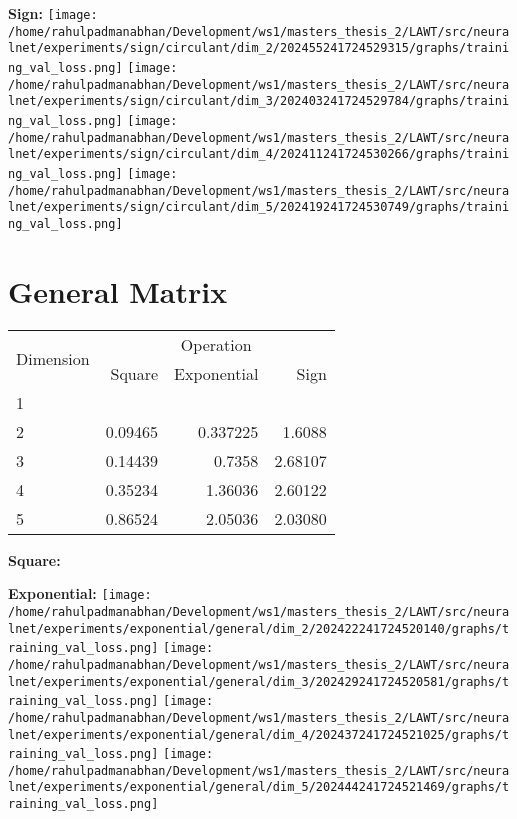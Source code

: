 \documentclass{article}
\begin{document}
\textbf{Sign:}
\texttt{[image: /home/rahulpadmanabhan/Development/ws1/masters\_thesis\_2/LAWT/src/neuralnet/experiments/sign/circulant/dim\_2/202455241724529315/graphs/training\_val\_loss.png]}
\texttt{[image: /home/rahulpadmanabhan/Development/ws1/masters\_thesis\_2/LAWT/src/neuralnet/experiments/sign/circulant/dim\_3/202403241724529784/graphs/training\_val\_loss.png]}
\texttt{[image: /home/rahulpadmanabhan/Development/ws1/masters\_thesis\_2/LAWT/src/neuralnet/experiments/sign/circulant/dim\_4/202411241724530266/graphs/training\_val\_loss.png]}
\texttt{[image: /home/rahulpadmanabhan/Development/ws1/masters\_thesis\_2/LAWT/src/neuralnet/experiments/sign/circulant/dim\_5/202419241724530749/graphs/training\_val\_loss.png]}

\pagebreak
\section{General Matrix}
\begin{tabular}{@{}lrrr@{}}
\toprule
\multirow{2}{*}{Dimension} & \multicolumn{3}{c}{Operation} \\
\cmidrule(l){2-4}
& Square & Exponential & Sign \\
\midrule
1 & & & \\
2 & 0.09465 & 0.337225 & 1.6088 \\
3 & 0.14439 & 0.7358 & 2.68107 \\
4 & 0.35234 & 1.36036 & 2.60122 \\
5 & 0.86524 & 2.05036 & 2.03080 \\
\bottomrule
\end{tabular}

\textbf{Square:}

\textbf{Exponential:}
\texttt{[image: /home/rahulpadmanabhan/Development/ws1/masters\_thesis\_2/LAWT/src/neuralnet/experiments/exponential/general/dim\_2/202422241724520140/graphs/training\_val\_loss.png]}
\texttt{[image: /home/rahulpadmanabhan/Development/ws1/masters\_thesis\_2/LAWT/src/neuralnet/experiments/exponential/general/dim\_3/202429241724520581/graphs/training\_val\_loss.png]}
\texttt{[image: /home/rahulpadmanabhan/Development/ws1/masters\_thesis\_2/LAWT/src/neuralnet/experiments/exponential/general/dim\_4/202437241724521025/graphs/training\_val\_loss.png]}
\texttt{[image: /home/rahulpadmanabhan/Development/ws1/masters\_thesis\_2/LAWT/src/neuralnet/experiments/exponential/general/dim\_5/202444241724521469/graphs/training\_val\_loss.png]}
\end{document}
